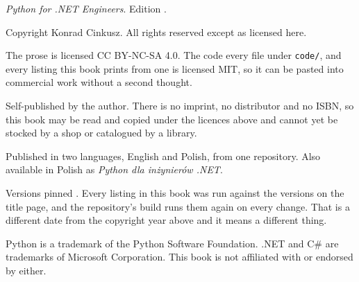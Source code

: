 
\thispagestyle{empty}
\vspace*{\fill}

{\small\color{mgrey}\raggedright\setlength{\parindent}{0pt}%
\emph{Python for .NET Engineers}. Edition \bookedition.

\medskip
Copyright \textcopyright{} \bookyear{} Konrad Cinkusz. All rights reserved
except as licensed here.

\medskip
The prose is licensed CC BY-NC-SA 4.0. The code \dash{} every file under
\texttt{code/}, and every listing this book prints from one \dash{} is
licensed MIT, so it can be pasted into commercial work without a second
thought.

\medskip
Self-published by the author. There is no imprint, no distributor and no
ISBN, so this book may be read and copied under the licences above and cannot
yet be stocked by a shop or catalogued by a library.

\medskip
Published in two languages, English and Polish, from one repository. Also
available in Polish as \emph{Python dla inżynierów .NET}.

\medskip
Versions pinned \pinnedon. Every listing in this book was run against the
versions on the title page, and the repository's build runs them again on
every change. That is a different date from the copyright year above and it
means a different thing.

\medskip
Python is a trademark of the Python Software Foundation. .NET and C\# are
trademarks of Microsoft Corporation. This book is not affiliated with or
endorsed by either.
\par}

\clearpage
